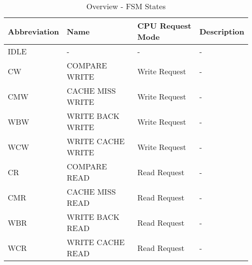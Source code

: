 \begin{table}
\caption{Overview - FSM States}
\label{tab:tableFSM}
\begin{tabular}{llll}
\hline %
Abbreviation & Name & CPU Request Mode & Description \\
\hline %
IDLE 	& -					& - 			& - \\
CW		& COMPARE WRITE		& Write Request & - \\
CMW		& CACHE MISS WRITE	& Write Request & - \\
WBW		& WRITE BACK WRITE	& Write Request & - \\
WCW		& WRITE CACHE WRITE	& Write Request & - \\
CR		& COMPARE READ		& Read Request 	& - \\
CMR		& CACHE MISS READ	& Read Request 	& - \\
WBR		& WRITE BACK READ	& Read Request 	& - \\
WCR		& WRITE CACHE READ	& Read Request 	& - \\
\hline %
\end{tabular} 
\end{table}